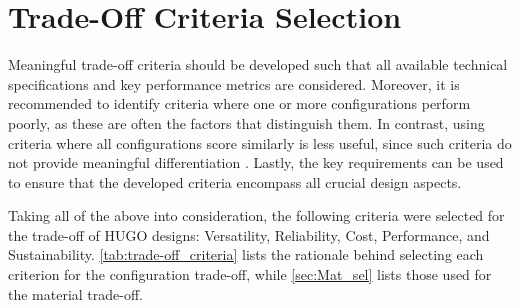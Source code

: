 \section{Trade-Off Criteria Selection}
\label{sec:trade-off_criteria_selection}
Meaningful trade-off criteria should be developed such that all available technical specifications and key performance metrics are considered. Moreover, it is recommended to identify criteria where one or more configurations perform poorly, as these are often the factors that distinguish them. In contrast, using criteria where all configurations score similarly is less useful, since such criteria do not provide meaningful differentiation \cite{SMAD}. Lastly, the key requirements can be used to ensure that the developed criteria encompass all crucial design aspects.

Taking all of the above into consideration, the following criteria were selected for the trade-off of HUGO designs: Versatility, Reliability, Cost, Performance, and Sustainability. \autoref{tab:trade-off_criteria} lists the rationale behind selecting each criterion for the configuration trade-off, while \autoref{sec:Mat_sel} lists those used for the material trade-off.


